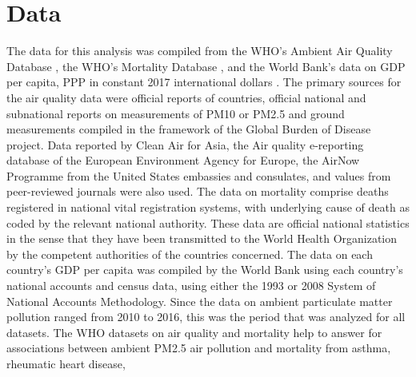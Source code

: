 \documentclass[12pt, letterpaper, twoside]{article}\usepackage[]{graphicx}\usepackage[]{xcolor}
\begin{document}
\section*{Data}
The data for this analysis was compiled from the WHO's Ambient Air Quality
Database \citep{who2022airquality}, the WHO's Mortality Database
\citep{who2022all}, and the World Bank's data on GDP per capita, PPP
in constant 2017 international dollars \citep{worldbank2022}. The primary sources
for the air quality data were official reports of countries, official national
and subnational reports on measurements of PM10 or PM2.5 and ground measurements
compiled in the framework of the Global Burden of Disease project. Data reported
by Clean Air for Asia, the Air quality e-reporting database of the European
Environment Agency for Europe, the AirNow Programme from the United States
embassies and consulates, and values from peer-reviewed journals were also used.
The data on mortality comprise deaths registered in national vital registration
systems, with underlying cause of death as coded by the relevant national
authority. These data are official national statistics in the sense that they
have been transmitted to the World Health Organization by the competent
authorities of the countries concerned. The data on each country's GDP per
capita was compiled by the World Bank using each country's national accounts and
census data, using either the 1993 or 2008 System of National Accounts
Methodology. Since the data on ambient particulate matter pollution ranged from
2010 to 2016, this was the period that was analyzed for all datasets. The WHO
datasets on air quality and mortality help to answer for associations between
ambient PM2.5 air pollution and mortality from asthma, rheumatic heart disease,
\end{document}
